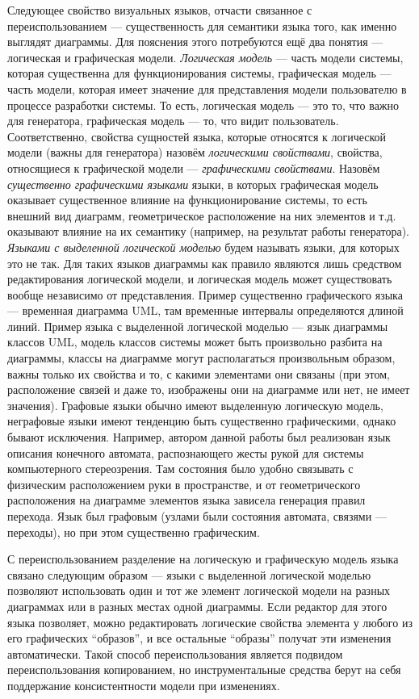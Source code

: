 Следующее свойство визуальных языков, отчасти связанное с переиспользованием 
--- существенность для семантики языка того, как именно выглядят диаграммы. 
Для пояснения этого потребуются ещё два понятия --- логическая и графическая 
модели. 
\textit{Логическая модель} --- часть модели системы, которая существенна для 
функционирования системы, графическая модель --- часть модели, которая имеет 
значение для представления модели пользователю в процессе разработки системы. 
То есть, логическая модель --- это то, что важно для генератора, графическая 
модель --- то, что видит пользователь. Соответственно, свойства сущностей языка, 
которые относятся к логической модели (важны для генератора) назовём \textit{логическими 
свойствами}, свойства, относящиеся к графической модели --- \textit{графическими 
свойствами}. Назовём \textit{существенно графическими языками} языки, в которых 
графическая модель оказывает существенное влияние на функционирование системы, 
то есть внешний вид диаграмм, геометрическое расположение на них элементов 
и т.д. оказывают влияние на их семантику (например, на результат работы генератора). \textit{Языками с выделенной 
логической моделью} будем называть языки, для которых это не так. Для таких 
языков диаграммы как правило являются лишь средством редактирования логической 
модели, и логическая модель может существовать вообще независимо от 
представления. Пример существенно графического языка --- временная диаграмма 
UML, там временные интервалы определяются длиной линий. Пример языка с 
выделенной логической моделью --- язык диаграммы классов UML, модель классов 
системы может быть произвольно разбита на диаграммы, классы на диаграмме могут 
располагаться произвольным образом, важны только их свойства и то, с какими 
элементами они связаны (при этом, расположение связей и даже то, изображены 
они на диаграмме или нет, не имеет значения). Графовые языки обычно имеют 
выделенную логическую модель, неграфовые языки имеют тенденцию быть существенно 
графическими, однако бывают исключения. Например, автором данной работы был 
реализован язык описания конечного автомата, распознающего жесты рукой для 
системы компьютерного стереозрения. Там состояния было удобно связывать с 
физическим расположением руки в пространстве, и от геометрического расположения 
на диаграмме элементов языка зависела генерация правил перехода. Язык был 
графовым (узлами были состояния автомата, связями --- переходы), но при этом 
существенно графическим.

С переиспользованием разделение на логическую и графическую модель языка связано 
следующим образом --- языки с выделенной логической моделью позволяют 
использовать один и тот же элемент логической модели на разных диаграммах или 
в разных местах одной диаграммы. Если редактор для этого языка позволяет, можно 
редактировать логические свойства элемента у любого из его графических 
"`образов"', и все остальные "`образы"' получат эти изменения автоматически. 
Такой способ переиспользования является подвидом переиспользования 
копированием, но инструментальные средства берут на себя поддержание 
консистентности модели при изменениях. 
